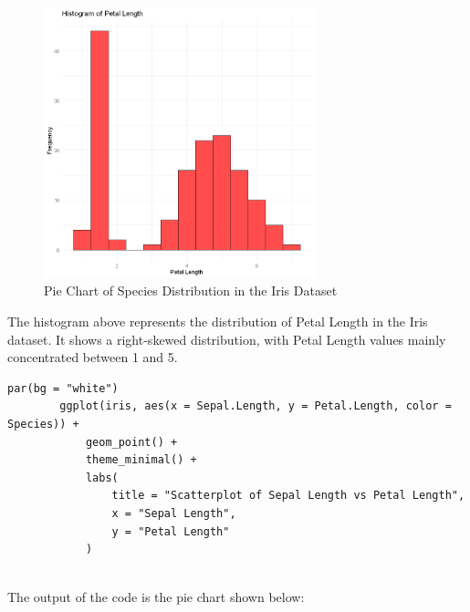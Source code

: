 \documentclass[a4paper,12pt]{article}
\begin{document}
    \begin{figure}[h]
        \includegraphics[width=0.7\textwidth]{Images/04.png}
        \caption{Pie Chart of Species Distribution in the Iris Dataset}
        \label{fig:pie_chart}
    \end{figure}
    The histogram above represents the distribution of Petal Length in the Iris dataset. It shows a right-skewed distribution, with Petal Length values mainly concentrated between 1 and 5.

    \newpage

    \begin{lstlisting}[style=RStyle]
        par(bg = "white")
        ggplot(iris, aes(x = Sepal.Length, y = Petal.Length, color = Species)) +
            geom_point() +
            theme_minimal() +
            labs(
                title = "Scatterplot of Sepal Length vs Petal Length",
                x = "Sepal Length", 
                y = "Petal Length"
            )
        
    \end{lstlisting}
        
    The output of the code is the pie chart shown below:
    
\end{document}
